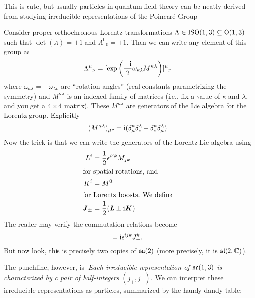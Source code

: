 This is cute, but usually particles in quantum field theory can be
neatly derived from studying irreducible representations of the Poincar\'{e} Group.

Consider proper orthochronous Lorentz transformations
$\Lambda\in\mathrm{ISO}(1,3)\subseteq\mathrm{O}(1,3)$ such that $\det(\Lambda)=+1$ and
${\Lambda^{0}}_{0}=+1$. Then we can write any element of this group as
\begin{equation}
{\Lambda^{\mu}}_{\nu} = [\exp\left(\frac{-\mathrm{i}}{2}\omega_{\kappa\lambda}M^{\kappa\lambda}\right)]{{}^{\mu}}_{\nu}
\end{equation}
where $\omega_{\kappa\lambda}=-\omega_{\lambda\kappa}$ are ``rotation
angles'' (real constants parametrizing the symmetry) and
$M^{\kappa\lambda}$ is an indexed family of matrices (i.e., fix a value
of $\kappa$ and $\lambda$, and you get a $4\times4$ matrix). These $M^{\kappa\lambda}$ are
generators of the Lie algebra for the Lorentz group. Explicitly
\begin{equation}
(M^{\kappa\lambda})_{\mu\nu} = \mathrm{i}(\delta^{\kappa}_{\mu}\delta^{\lambda}_{\nu}-\delta^{\kappa}_{\nu}\delta^{\lambda}_{\mu})
\end{equation}
Now the trick is that we can write the generators of the Lorentz Lie
algebra using
\begin{subequations}
\begin{align}
L^{i} &= \frac{1}{2}\epsilon^{ijk}M_{jk}\\
\intertext{for spatial rotations, and}
K^{i} &= M^{0i}\\
\intertext{for Lorentz boosts. We define}
\boldsymbol{J}_{\pm} &= \frac{1}{2}(\boldsymbol{L}\pm\mathrm{i}\boldsymbol{K}).
\end{align}
\end{subequations}
The reader may verify the commutation relations become
\begin{equation}
[J^{i}_{\pm}, J^{j}_{\pm}] = \I\epsilon^{ijk}J^{k}_{\pm}.
\end{equation}
But now look, this is precisely two copies of $\mathfrak{su}(2)$ (more precisely,
it is $\mathfrak{sl}(2,\mathbb{C})$).

The punchline, however, is: \textit{Each irreducible representation of $\mathfrak{so}(1,3)$
is characterized by a pair of half-integers $(j_{+}, j_{-})$.} We can
interpret these irreducible representations as particles, summarized by
the handy-dandy table:

